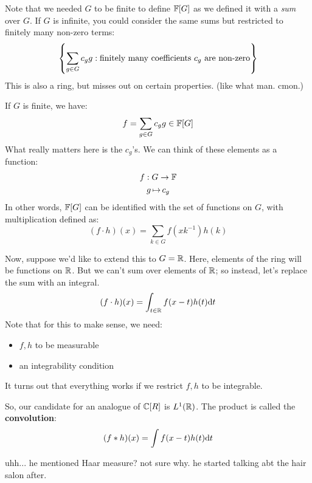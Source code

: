 Note that we needed $ G $ to be finite to define $ \mathbb{F}[G] $ as we defined it with a \textit{sum}
over $ G $. If $ G $ is infinite, you could consider the same sums but restricted to finitely many
non-zero terms:
\begin{equation*}
    \left\{{\sum_{g \in G} c_{g}g : \textrm{finitely many coefficients $ c_{g} $ are non-zero}}\right\}
\end{equation*}
This is also a ring, but misses out on certain properties.
(like what man. cmon.)

If $ G $ is finite, we have:
\begin{equation*}
    f = \sum_{g \in G}c_{g}g \in \mathbb{F}[G]
\end{equation*}
What really matters here is the $ c_{g} $'s.
We can think of these elements as a function:
\begin{gather*}
    f : G \rightarrow \mathbb{F} \\
    g \operatorname{\mapsto} c_{g}
\end{gather*}
In other words, $ \mathbb{F}[G] $ can be identified with the set of functions on $ G $,
with multiplication defined as:
\begin{equation*}
    (f \cdot h)(x) = \sum_{k \in G}f(xk^{-1})h(k)
\end{equation*}

Now, suppose we'd like to extend this to $ G = \mathbb{R} $.
Here, elements of the ring will be functions on $ \mathbb{R} $.
But we can't sum over elements of $ \mathbb{R} $; so instead, let's replace the sum with an integral.
\begin{equation*}
    (f \cdot h)(x) = \int_{t \in \mathbb{R}}f(x - t)h(t)\textrm{d} t
\end{equation*}
\newpage
Note that for this to make sense, we need:
\begin{itemize}
    \item $ f, h $ to be measurable
    \item an integrability condition
\end{itemize}
It turns out that everything works if we restrict $ f, h $ to be integrable.

So, our candidate for an analogue of $ \mathbb{C}[R] $ is $ L^{1}(\mathbb{R}) $.
The product is called the \textbf{convolution}:
\begin{equation*}
    (f * h)(x) = \int f(x - t)h(t) \textrm{d} t
\end{equation*}

uhh... he mentioned Haar measure? not sure why. he started talking abt the hair salon after.

